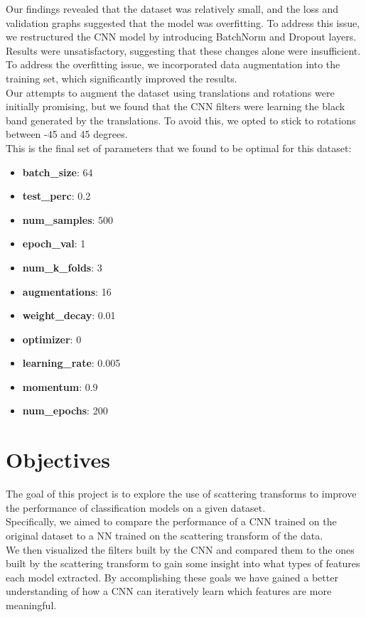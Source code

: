 \documentclass{report}
\begin{document}
Our findings revealed that the dataset was relatively small, and the loss and validation
graphs suggested that the model was overfitting. To address this issue, we restructured the
CNN model by introducing BatchNorm and Dropout layers. Results were unsatisfactory, suggesting that these changes alone were insufficient.
To address the overfitting issue, we incorporated data augmentation into the training set,
which significantly improved the results. \\
Our attempts to augment the dataset using translations and rotations were initially promising,
but we found that the CNN filters were learning the black band generated by the translations.
To avoid this, we opted to stick to rotations between -45 and 45 degrees.\\
This is the final set of parameters that we found to be optimal for this dataset:
\begin{itemize}
  \item \textbf{batch\_size}: 64
  \item \textbf{test\_perc}: 0.2
  \item \textbf{num\_samples}: 500
  \item \textbf{epoch\_val}: 1
  \item \textbf{num\_k\_folds}: 3
  \item \textbf{augmentations}: 16
  \item \textbf{weight\_decay}: 0.01
  \item \textbf{optimizer}: 0
  \item \textbf{learning\_rate}: 0.005
  \item \textbf{momentum}: 0.9 
  \item \textbf{num\_epochs}: 200
\end{itemize}


\chapter{Objectives}
The goal of this project is to explore the use of scattering transforms to improve the performance of classification models on a given dataset.\\
Specifically, we aimed to compare the performance of a CNN trained on the original dataset to a NN trained on the scattering transform of the data.\\

We then visualized the filters built by the CNN and compared them to the ones built by the scattering transform to gain some insight into what types of features each model extracted.
By accomplishing these goals we have gained a better understanding of how a CNN can iteratively learn which features are more meaningful.
\end{document}
